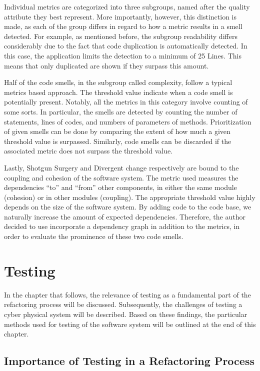 Individual metrics are categorized into three subgroups, named after the quality attribute they best represent. More importantly, however, this distinction is made, as each of the group differs in regard to how a metric results in a smell detected. For example, as mentioned before, the subgroup readability differs considerably due to the fact that code duplication is automatically detected. In this case, the application limits the detection to a minimum of 25 Lines. This means that only duplicated are shown if they surpass this amount. 

Half of the code smells, in the subgroup called complexity, follow a typical metrics based approach. The threshold value indicate when a code smell is potentially present. Notably, all the metrics in this category involve counting of some sorts. In particular, the smells are detected by counting the number of statements, lines of codes, and numbers of parameters of methods. Prioritization of given smells can be done by comparing the extent of how much a given threshold value is surpassed. Similarly, code smells can be discarded if the associated metric does not surpass the threshold value. 

Lastly, Shotgun Surgery and Divergent change respectively are bound to the coupling and cohesion of the software system. The metric used measures the dependencies “to” and “from” other components, in either the same module (cohesion) or in other modules (coupling). The appropriate threshold value highly depends on the size of the software system. By adding code to the code base, we naturally increase the amount of expected dependencies. Therefore, the author decided to use incorporate a dependency graph in addition to the metrics, in order to evaluate the prominence of these two code smells.


\section{Testing}
In the chapter that follows, the relevance of testing as a fundamental part of the refactoring process will be discussed. Subsequently, the challenges of testing a cyber physical system will be described. Based on these findings, the particular methods used for testing of the software system 
will be outlined at the end of this chapter.

\subsection{Importance of Testing in a Refactoring Process}

